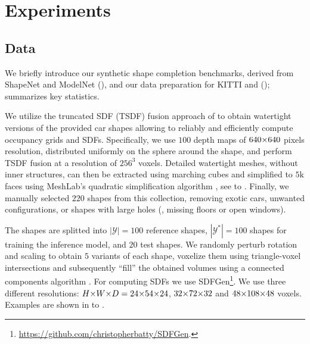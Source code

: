 \section{Experiments}



\subsection{Data}
\label{sec:data}

We briefly introduce our synthetic shape completion benchmarks, derived from ShapeNet \citep{Chang2015ARXIV} and ModelNet \citep{Wu2015CVPR} (\cf {}), and our data preparation for KITTI \citep{Geiger2012CVPR} and \Kinect \citep{Yang2018ARXIVb} (\cf {});  summarizes key statistics.

%
We utilize the truncated SDF (TSDF) fusion approach of \cite{Riegler2017THREEDV} to obtain watertight versions of the provided car shapes allowing to reliably and efficiently compute occupancy grids and SDFs. Specifically, we use $100$ depth maps of $640 \operatorname*{\!\times\!} 640$ pixels resolution, distributed uniformly on the sphere around the shape, and perform TSDF fusion at a resolution of $256^3$ voxels. Detailed watertight meshes, without inner structures, can then be extracted using marching cubes \citep{Lorensen1987SIGGRAPH} and simplified to $5\text{k}$ faces using MeshLab's quadratic simplification algorithm \citep{Cignoni2008EICC}, see  to . Finally, we manually selected $220$ shapes from this collection, removing exotic cars, unwanted configurations, or shapes with large holes (\eg, missing floors or open windows).

The shapes are splitted into $|\mathcal{Y}| = 100$ reference shapes, $|\mathcal{Y}^*| = 100$ shapes for training the inference model, and $20$ test shapes. We randomly perturb rotation and scaling to obtain $5$ variants of each shape, voxelize them using triangle-voxel intersections and subsequently ``fill'' the obtained volumes using a connected components algorithm \citep{Jones2001}. For computing SDFs we use SDFGen\footnote{\url{https://github.com/christopherbatty/SDFGen}.}. We use three different resolutions: $H \ntimes W \ntimes D = 24 \ntimes 54 \ntimes 24$, $32 \operatorname*{\!\times\!} 72 \operatorname*{\!\times\!} 32$ and $48 \operatorname*{\!\times\!} 108 \operatorname*{\!\times\!} 48$ voxels. Examples are shown in  to .

